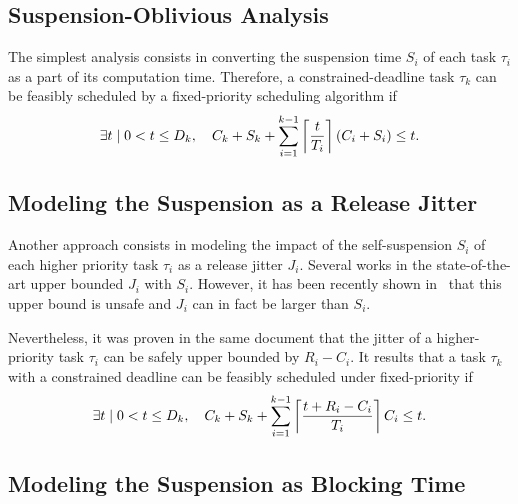 \subsection{Suspension-Oblivious Analysis}
\label{sec:suspension-oblivious} 
The simplest analysis consists in converting the suspension time $S_i$ of each %
task $\tau_i$ as a part of its computation
time. Therefore, a constrained-deadline task $\tau_k$ can be feasibly
scheduled by a fixed-priority scheduling algorithm if
\begin{equation}
\label{eq:TDA-SO}
\exists t \mid 0 < t \leq D_k, \quad C_k + S_k + \sum_{i=1}^{k-1}\ceiling{\frac{t}{T_i}} (C_i+S_i) \leq t.
\end{equation}

\subsection{Modeling the Suspension as a Release Jitter}
\label{sec:jitter}

Another approach consists in modeling the impact of the self-suspension $S_i$ of each higher priority task $\tau_i$ as a release jitter $J_i$. Several works in the state-of-the-art \cite{ECRTS-AudsleyB04,RTAS-AudsleyB04,RTCSA-KimCPKH95,MingLiRTCSA1994} upper bounded $J_i$ with $S_i$. However, it has been recently shown in~\cite{BletsasReport2015} that this upper bound is unsafe and $J_i$ can in fact be larger than $S_i$. 

Nevertheless, it was proven in the same document \cite{BletsasReport2015} that the jitter of a higher-priority task $\tau_i$ can be safely upper bounded by $R_i-C_i$. It results that a task
$\tau_k$ with a constrained deadline can be feasibly scheduled under fixed-priority if
\begin{equation}
\label{eq:TDA-jitter}
\exists t \mid 0 < t \leq D_k, \quad C_k + S_k + \sum_{i=1}^{k-1}\ceiling{\frac{t+R_i-C_i}{T_i}} C_i \leq t.
\end{equation}

\subsection{Modeling the Suspension as Blocking Time}
\label{sec:suspension-blocking}

